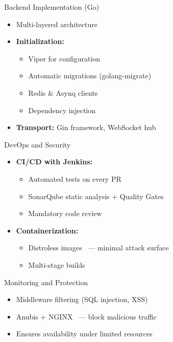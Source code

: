 \documentclass[10pt, aspectratio=169]{beamer}
\begin{document}
\begin{frame}{Backend Implementation (Go)}
	\begin{itemize}
		\item Multi-layered architecture
		\item \textbf{Initialization:}
		      \begin{itemize}
			      \item Viper for configuration
			      \item Automatic migrations (golang-migrate)
			      \item Redis \& Asynq clients
			      \item Dependency injection
		      \end{itemize}
		\item \textbf{Transport:} Gin framework, WebSocket hub
	\end{itemize}
\end{frame}

\begin{frame}{DevOps and Security}
	\begin{itemize}
		\item \textbf{CI/CD with Jenkins:}
		      \begin{itemize}
			      \item Automated tests on every PR
			      \item SonarQube static analysis + Quality Gates
			      \item Mandatory code review
		      \end{itemize}
		\item \textbf{Containerization:}
		      \begin{itemize}
			      \item Distroless images ~--- minimal attack surface
			      \item Multi-stage builds
		      \end{itemize}
	\end{itemize}
\end{frame}

\begin{frame}{Monitoring and Protection}
	\begin{itemize}
		\item Middleware filtering (SQL injection, XSS)
		\item Anubis + NGINX ~--- block malicious traffic
		\item Ensures availability under limited resources
	\end{itemize}
\end{frame}
\end{document}
